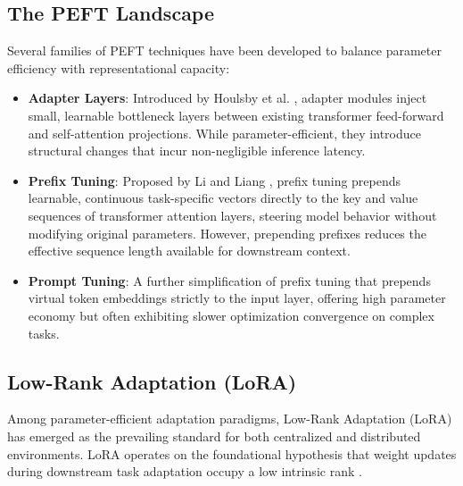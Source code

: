 \subsection{The PEFT Landscape}
\label{sec:peft_landscape}
Several families of PEFT techniques have been developed to balance parameter efficiency with representational capacity:
\begin{itemize}
    \item \textbf{Adapter Layers}: Introduced by Houlsby et al. \cite{houlsby2019parameter}, adapter modules inject small, learnable bottleneck layers between existing transformer feed-forward and self-attention projections. While parameter-efficient, they introduce structural changes that incur non-negligible inference latency.
    \item \textbf{Prefix Tuning}: Proposed by Li and Liang \cite{li2021prefix}, prefix tuning prepends learnable, continuous task-specific vectors directly to the key and value sequences of transformer attention layers, steering model behavior without modifying original parameters. However, prepending prefixes reduces the effective sequence length available for downstream context.
    \item \textbf{Prompt Tuning}: A further simplification of prefix tuning that prepends virtual token embeddings strictly to the input layer, offering high parameter economy but often exhibiting slower optimization convergence on complex tasks.
\end{itemize}

\subsection{Low-Rank Adaptation (LoRA)}
\label{sec:lora}
Among parameter-efficient adaptation paradigms, Low-Rank Adaptation (LoRA) \cite{hu2022lora} has emerged as the prevailing standard for both centralized and distributed environments. LoRA operates on the foundational hypothesis that weight updates during downstream task adaptation occupy a low intrinsic rank \cite{aghajanyan2021intrinsic}.

